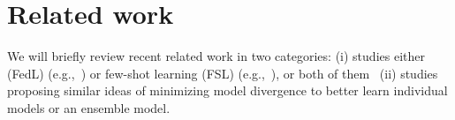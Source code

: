 





\section{Related work} 


We will briefly review recent related work 
in two categories: (i) studies
either \fdl (FedL) (e.g.,~\cite{fedavg,zhao2018federated,li2018federated,li2020federated,dinh2019federated,zhang2020fedpart}) or few-shot learning (FSL) (e.g.,~\cite{vinyals2016matching, snell2017prototypical,munkhdalai2017meta,li2017meta,sun2019mtl,Gidaris_2018_CVPR, sung2018learning, Li_2020_adap_margin}), or both of them~\cite{chen2018fedmeta} (ii) studies proposing similar ideas of minimizing model divergence to better learn individual models or an ensemble model.








